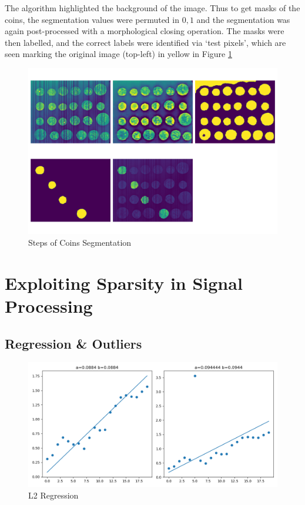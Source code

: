 \documentclass[12pt]{article}
\begin{document}
The algorithm highlighted the background of the image.
Thus to get masks of the coins, the segmentation values were permuted in ${0,1}$ and the segmentation was again post-processed with a morphological closing operation.
The masks were then labelled, and the correct labels were identified via `test pixels', which are seen marking the original image (top-left) in yellow in Figure \ref{fig:coins}

\begin{figure}[htp]
    \includegraphics[scale=0.35]{figures/coins_segmentation.png}
    \caption{Steps of Coins Segmentation}
    \label{fig:coins}
\end{figure}

\section{Exploiting Sparsity in Signal Processing}

\subsection{Regression \& Outliers}

\begin{figure}[htp]
    \includegraphics[scale=0.5]{figures/regression_l2.png}
    \caption{L2 Regression}
    \label{fig:regression_l2}
\end{figure}
\end{document}
